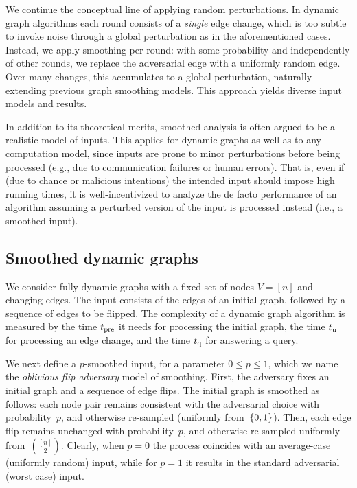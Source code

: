 \documentclass[letter,11pt]{article}
\newcommand{\tp}{t_{\textnormal{pre}}}
\newcommand{\tu}{t_{\textnormal{u}}}
\newcommand{\tq}{t_{\textnormal{q}}}
\begin{document}
We continue the conceptual line of applying random perturbations.
In dynamic graph algorithms each round consists of a \emph{single} edge change, which is too subtle to invoke noise through a global perturbation as in the aforementioned cases. 
Instead, we apply smoothing per round: with some probability and independently of other rounds, we replace the adversarial edge with a uniformly random edge.
Over many changes, this accumulates to a global perturbation, naturally extending previous graph smoothing models. 
This approach yields diverse input models and results. 

In addition to its theoretical merits, smoothed analysis is often argued to be a realistic model of inputs. This applies for dynamic graphs as well as to any computation model, since inputs are prone to minor perturbations before being processed (e.g., due to communication failures or human errors).
That is, even if (due to chance or malicious intentions) the intended input should impose high running times, it is well-incentivized to analyze the de facto performance of an algorithm assuming a perturbed version of the input is processed instead (i.e., a smoothed input). 


\subsection{Smoothed dynamic graphs}

We consider fully dynamic graphs with a fixed set of nodes $V=[n]$ and changing edges.
The input consists of the edges of an initial graph, followed by a sequence of edges to be flipped.
The complexity of a dynamic graph algorithm is measured by the time $\tp$ it needs for processing the initial graph, the time $\tu$ for processing an edge change, and the time $\tq$ for answering a query.

We next define a $p$-smoothed input, for a parameter $0\leq p\leq 1$, which we name the \emph{oblivious flip adversary} model of smoothing.
First, the adversary fixes an initial graph and a sequence of edge flips.
The initial graph is smoothed as follows: each node pair remains consistent with the adversarial choice with probability~$p$, and otherwise re-sampled (uniformly from~$\{0,1\}$).
Then, each edge flip remains unchanged with probability~$p$, and otherwise re-sampled uniformly from~$\binom{[n]}{2}$.
Clearly, when 
$p=0$ the process coincides with an average-case (uniformly random) input, while for $p=1$ it results in the standard adversarial (worst case) input.
\end{document}
